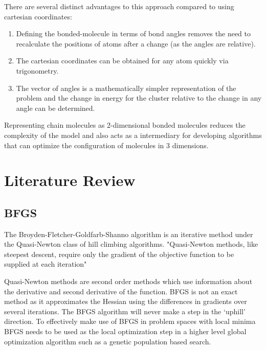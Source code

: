 \documentclass[conference,letterpaper]{IEEEtran}
\begin{document}
There are several distinct advantages to this approach compared to using cartesian coordinates:
\begin{enumerate}
    \item Defining the bonded-molecule in terms of bond angles removes the need to recalculate the positions of atoms after a change (as the angles are relative).
    \item The cartesian coordinates can be obtained for any atom quickly via trigonometry.
    \item The vector of angles is a mathematically simpler representation of the problem and the change in energy for the cluster relative to the change in any angle can be determined.
\end{enumerate}
\par Representing chain molecules as 2-dimensional bonded molecules reduces the complexity of the model and also acts as a intermediary for developing algorithms that can optimize the configuration of molecules in 3 dimensions.

\section{Literature Review}
\subsection{BFGS}
\par The Broyden-Fletcher-Goldfarb-Shanno algorithm is an iterative method under the Quasi-Newton class of hill climbing algorithms. "Quasi-Newton methods, like steepest descent, require only the gradient of the objective function to be supplied at each iteration" \cite{numericalOptimization} 
\par Quasi-Newton methods are second order methods which use information about the derivative and second derivative of the function. BFGS is not an exact method as it approximates the Hessian using the differences in gradients over several iterations. The BFGS algorithm will never make a step in the `uphill' direction. To effectively make use of BFGS in problem spaces with local minima BFGS needs to be used as the local optimization step in a higher level global optimization algorithm such as a genetic population based search.
\end{document}
